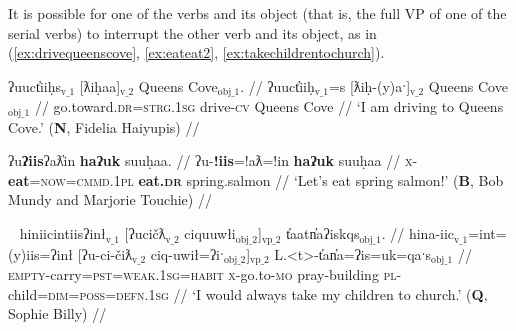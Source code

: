 It is possible for one of the verbs and its object (that is, the full VP of one of the serial verbs) to interrupt the other verb and its object, as in (\ref{ex:drivequeenscove}, \ref{ex:eateat2}, \ref{ex:takechildrentochurch}).

\ex \label{ex:drivequeenscove}
\begingl
\glpreamble ʔuuct̓iiḥs$_{\text{v\_1}}$ [ƛiḥaa]$_{\text{v\_2}}$ Queens Cove$_{\text{obj\_1}}$. //
\gla ʔuuct̓iiḥ$_{\text{v\_1}}$=s [ƛiḥ-(y)aˑ]$_{\text{v\_2}}$ Queens Cove$_{\text{obj\_1}}$ //
\glb go.toward.\textsc{dr}=\textsc{strg.1sg} drive-\textsc{cv} Queens Cove //
\glft `I am driving to Queens Cove.' (\textbf{N}, Fidelia Haiyupis) //
\endgl
\xe

\ex \label{ex:eateat2}
\begingl
\glpreamble ʔu\textbf{ʔiis}ʔaƛ̓in \textbf{haʔuk} suuḥaa. //
\gla ʔu-\textbf{!iis}=!aƛ=!in \textbf{haʔuk} suuḥaa //
\glb \textsc{x}-\textbf{eat}=\textsc{now}=\textsc{cmmd.1pl} \textbf{eat.\textsc{dr}} spring.salmon //
\glft `Let's eat spring salmon!' (\textbf{B}, Bob Mundy and Marjorie Touchie) //
\endgl
\xe

\ex~ \label{ex:takechildrentochurch}
\begingl
\glpreamble hiniicintiisʔinł$_{\text{v\_1}}$ [ʔucičƛ$_{\text{v\_2}}$ ciquuwłi$_{\text{obj\_2}}$]$_{\text{vp\_2}}$ t̓aatn̓aʔiskqs$_{\text{obj\_1}}$. //
\gla hina-iic$_{\text{v\_1}}$=int=(y)iis=ʔinł [ʔu-ci-čiƛ$_{\text{v\_2}}$ ciq-uwił=ʔiˑ$_{\text{obj\_2}}$]$_{\text{vp\_2}}$ L.<t>-t̓an̓a=ʔis=uk=qaˑs$_{\text{obj\_1}}$  //
\glb \textsc{empty}-carry=\textsc{pst}=\textsc{weak.1sg}=\textsc{habit} \textsc{x}-go.to-\textsc{mo} pray-building \textsc{pl}-child=\textsc{dim}=\textsc{poss}=\textsc{defn.1sg} //
\glft `I would always take my children to church.' (\textbf{Q}, Sophie Billy) //
\endgl
\xe



